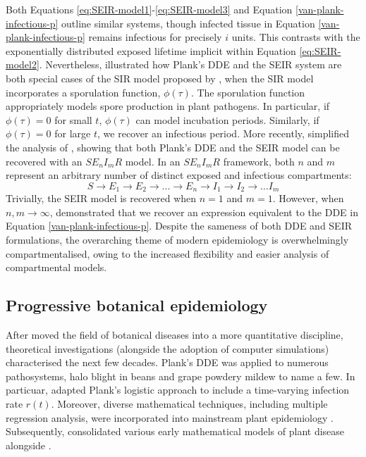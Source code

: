 Both Equations \ref{eq:SEIR-model1}-\ref{eq:SEIR-model3} and Equation \ref{van-plank-infectious-p} outline similar systems,
though infected tissue in Equation \ref{van-plank-infectious-p} remains infectious for precisely $i$ units.
This contrasts with the exponentially distributed exposed lifetime implicit within Equation \ref{eq:SEIR-model2}.
Nevertheless, \cite{segarra2001epidemic} illustrated how Plank's DDE and the SEIR system are both special cases of
the SIR model proposed by \cite{kermack-model}, when the SIR model incorporates a sporulation function, $\phi(\tau)$. 
The sporulation function appropriately models spore production in plant pathogens. 
In particular, if $\phi(\tau) = 0$ for small $t$, $\phi(\tau)$ can model incubation periods. 
Similarly, if $\phi(\tau) = 0$  for large $t$, we recover an infectious period. 
More recently, \cite{time-varying-infectivity} simplified the analysis of \cite{segarra2001epidemic}, showing that 
both Plank's DDE and the SEIR model can be recovered with an $SE_nI_mR$ model.
In an $SE_nI_mR$ framework, both $n$ and $m$ represent an arbitrary number of distinct exposed and infectious compartments:
\[
    S\rightarrow E_1 \rightarrow E_2 \rightarrow ... \rightarrow E_n \rightarrow I_1 \rightarrow I_2 \rightarrow \hdots I_m
\]
Trivially, the SEIR model is recovered when $n=1$ and $m=1$. However, when $n,m \rightarrow \infty$,
\cite{time-varying-infectivity} demonstrated that we recover an expression equivalent to the DDE in Equation \ref{van-plank-infectious-p}.
Despite the sameness of both DDE and SEIR formulations, the overarching theme of modern epidemiology is overwhelmingly compartmentalised,
owing to the increased flexibility and easier analysis of compartmental models.


\subsection{Progressive botanical epidemiology}
\label{sec:prog-epi}
After \cite{van2013plant} moved the field of botanical diseases into a more quantitative discipline,
theoretical investigations (alongside the adoption of computer simulations) characterised the next few decades.
Plank's DDE was applied to numerous pathosystems, halo blight in beans \cite{doi:10.1111/j.1744-7348.1979.tb06527.x} 
and grape powdery mildew \cite{sall1980epidemiology} to name a few. In particuar, \cite{sall1980epidemiology} adapted Plank's
logistic approach to include a time-varying infection rate $r(t)$. Moreover, diverse mathematical techniques, 
including multiple  regression analysis, were incorporated into mainstream plant epidemiology \cite{butt1974multiple}. 
Subsequently, \cite{zadoks1979epidemiology} consolidated various early mathematical models of plant disease 
alongside \cite{jeger1984use}.


